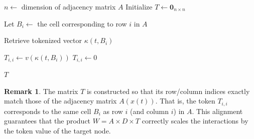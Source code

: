 \documentclass[11pt,a4paper]{article}
\theoremstyle{plain}
\theoremstyle{definition}
\newtheorem{remark}{Remark}[section]
\begin{document}
\vspace{0.5em}

\begin{algorithm}[H]
\caption{Construction of Token Matrix \( T(x(t)) \) Aligned with Adjacency}
\label{alg:construct_T_aligned}
\begin{algorithmic}[1]
    \State $n \gets$ dimension of adjacency matrix $A$   
    \State Initialize $T \gets \mathbf{0}_{n \times n}$  
    
        \State Let $B_i \gets$ the cell corresponding to row $i$ in $A$ 
        
        \State Retrieve tokenized vector $\kappa(t, B_i)$
        
           
            \State $T_{i,i} \gets v(\kappa(t, B_i))$   
        \Else
            \State $T_{i,i} \gets 0$
        \EndIf
    \EndFor
    
    \State \Return $T$
\EndProcedure
\end{algorithmic}
\end{algorithm}

\vspace{0.5em}

\begin{remark}
The matrix \(T\) is constructed so that its row/column indices exactly match those of the adjacency matrix \(A(x(t))\). 
That is, the token \(T_{i,i}\) corresponds to the same cell \(B_i\) as row \(i\) (and column \(i\)) in \(A\). 
This alignment guarantees that the product \(W = A \times D \times T\) correctly scales the interactions by the token value of the target node.
\end{remark}

\vspace{0.5em}
\end{document}
